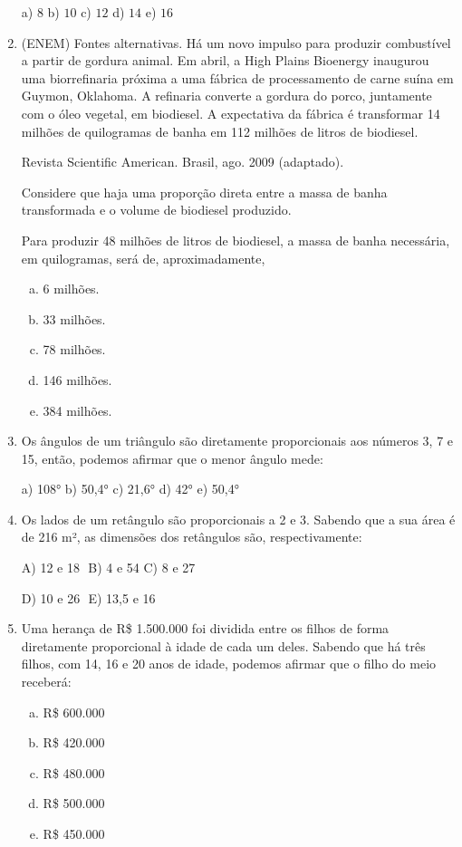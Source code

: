 \begin{multicols*}{2}
\begin{enumerate}[wide, labelwidth=!, labelindent=0pt]
		      a) $8 $ b) $10 $ c) $12 $ d) $14 $ e) $16 $

		\item (ENEM) Fontes alternativas. Há um novo impulso para produzir combustível a partir de gordura animal. Em abril, a High Plains Bioenergy inaugurou uma biorrefinaria próxima a uma fábrica de processamento de carne suína em Guymon, Oklahoma. A refinaria converte a gordura do porco, juntamente com o óleo vegetal, em biodiesel. A expectativa da fábrica é transformar 14 milhões de quilogramas de banha em 112 milhões de litros de biodiesel.

		      Revista Scientific American. Brasil, ago. 2009 (adaptado).

		      Considere que haja uma proporção direta entre a massa de banha transformada e o volume de biodiesel produzido.

		      Para produzir 48 milhões de litros de biodiesel, a massa de banha necessária, em quilogramas, será de, aproximadamente,

			  \begin{enumerate}[(a)]
				\item 6 milhões.
				\item 33 milhões.
				\item 78 milhões.
				\item 146 milhões.
				\item 384 milhões.
			\end{enumerate}

		\item Os ângulos de um triângulo são diretamente proporcionais aos números 3, 7 e 15, então, podemos afirmar que o menor ângulo mede:

		      a) 108°  b) 50,4°  c) 21,6°  d) 42°  e) 50,4°

		\item Os lados de um retângulo são proporcionais a 2 e 3. Sabendo que a sua área é de 216 m², as dimensões dos retângulos são, respectivamente:

		      A) 12 e 18 $ $ B) 4 e 54$ $ C) 8 e 27

		      D) 10 e 26 $ $ E) 13,5 e 16

		\item Uma herança de R\$ 1.500.000 foi dividida entre os filhos de forma diretamente proporcional à idade de cada um deles. Sabendo que há três filhos, com 14, 16 e 20 anos de idade, podemos afirmar que o filho do meio receberá:
		\begin{enumerate}[(a)]
			\item R\$ 600.000
			\item R\$ 420.000
			\item R\$ 480.000
			\item R\$ 500.000
			\item R\$ 450.000
		\end{enumerate}


\end{enumerate}
\end{multicols*}
